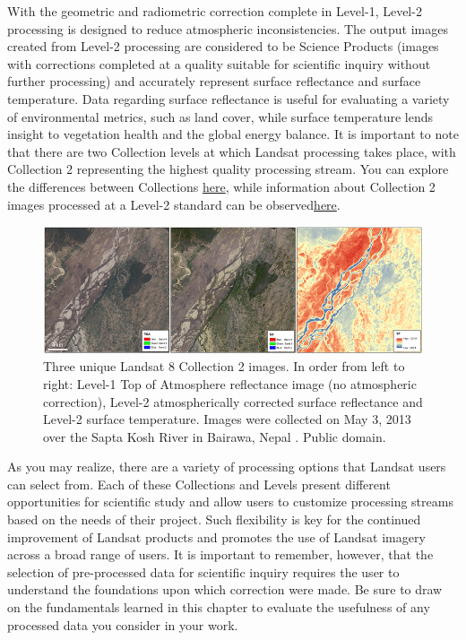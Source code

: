 \documentclass[
]{book}
\begin{document}
With the geometric and radiometric correction complete in Level-1, Level-2 processing is designed to reduce atmospheric inconsistencies. The output images created from Level-2 processing are considered to be Science Products (images with corrections completed at a quality suitable for scientific inquiry without further processing) and accurately represent surface reflectance and surface temperature. Data regarding surface reflectance is useful for evaluating a variety of environmental metrics, such as land cover, while surface temperature lends insight to vegetation health and the global energy balance. It is important to note that there are two Collection levels at which Landsat processing takes place, with Collection 2 representing the highest quality processing stream. You can explore the differences between Collections \href{https://prd-wret.s3.us-west-2.amazonaws.com/assets/palladium/production/atoms/files/Landsat-C1vsC2-2\%2021-0430-LMWS.pdf}{here}, while information about Collection 2 images processed at a Level-2 standard can be observed\href{https://www.usgs.gov/core-science-systems/nli/landsat/landsat-collection-2-level-2-scien\%20e-products}{here}.



\begin{figure}
\includegraphics[width=0.75\linewidth]{images/13-landsat-c2-l2} \caption{Three unique Landsat 8 Collection 2 images. In order from left to right: Level-1 Top of Atmosphere reflectance image (no atmospheric correction), Level-2 atmospherically corrected surface reflectance and Level-2 surface temperature. Images were collected on May 3, 2013 over the Sapta Kosh River in Bairawa, Nepal \citep{bouchard_example_2013}. Public domain.}\label{fig:13-landsat-c2-l2}
\end{figure}

As you may realize, there are a variety of processing options that Landsat users can select from. Each of these Collections and Levels present different opportunities for scientific study and allow users to customize processing streams based on the needs of their project. Such flexibility is key for the continued improvement of Landsat products and promotes the use of Landsat imagery across a broad range of users. It is important to remember, however, that the selection of pre-processed data for scientific inquiry requires the user to understand the foundations upon which correction were made. Be sure to draw on the fundamentals learned in this chapter to evaluate the usefulness of any processed data you consider in your work.
\end{document}
